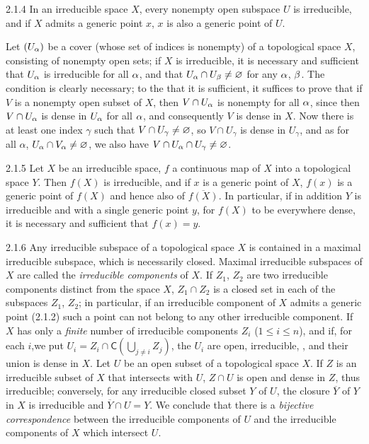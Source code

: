 \documentclass[../main.tex]{subfiles}
\begin{document}
\begin{cx}{2.1.4}
In an irreducible space $X$, every nonempty open subspace $U$ is irreducible, and if $X$
admits a generic point $x$, $x$ is also a generic point of $U$.

Let $(U_\alpha)$ be a cover (whose set of indices is nonempty) of a topological space $X$,
consisting of nonempty open sets; if $X$ is irreducible, it is necessary and sufficient that
$U_\alpha$ is irreducible for all $\alpha$, and that $U_\alpha\cap U_\beta\neq\varnothing$ for any
$\alpha$, $\beta$. The condition is clearly necessary; to the that it is sufficient, it suffices
to prove that if $V$ is a nonempty open subset of $X$, then $V\cap U_\alpha$ is nonempty for all
$\alpha$, since then $V\cap U_\alpha$ is dense in $U_\alpha$ for all $\alpha$, and consequently
$V$ is dense in $X$. Now there is at least one index $\gamma$ such that $V\cap U_\gamma\neq\varnothing$,
so $V\cap U_\gamma$ is dense in $U_\gamma$, and as for all $\alpha$, $U_\alpha\cap V_\alpha\neq\varnothing$,
we also have $V\cap U_\alpha\cap U_\gamma\neq\varnothing$.
\end{cx}

\begin{cx}{2.1.5}
Let $X$ be an irreducible space, $f$ a continuous map of $X$ into a topological space $Y$.
Then $f(X)$ is irreducible, and if $x$ is a generic point of $X$, $f(x)$ is a generic point of
$f(X)$ and hence also of $\overline{f(X)}$. In particular, if in addition $Y$ is irreducible and
with a single generic point $y$, for $f(X)$ to be everywhere dense, it is necessary and sufficient
that $f(x)=y$.
\end{cx}

\begin{cx}{2.1.6}
Any irreducible subspace of a topological space $X$ is contained
in a maximal irreducible subspace, which is necessarily closed.
Maximal irreducible subspaces of $X$ are called the \emph{irreducible components} of $X$.
If $Z_1$, $Z_2$ are two irreducible components distinct from the space $X$, $Z_1\cap Z_2$ is a closed
 set in each of the subspaces $Z_1$, $Z_2$; in particular, if an irreducible component
of $X$ admits a generic point (2.1.2) such a point can not belong to any other
irreducible component. If $X$ has only a \emph{finite} number of irreducible 
components $Z_i$ ($1\leq i\leq n$), and if, for each $i$,we put $U_i=Z_i\cap\mathsf{C}(\bigcup_{j\neq i} Z_j)$,
the $U_i$ are open, irreducible, , and their union is dense in $X$.
Let $U$ be an open subset of a topological space $X$. If $Z$ is an irreducible subset of $X$
that intersects with $U$, $Z\cap U$ is open and dense in $Z$, thus irreducible; conversely, for any irreducible
closed subset $Y$ of $U$, the closure $\overline{Y}$ of $Y$ in $X$ is irreducible and $\overline{Y}\cap U=Y$.
We conclude that there is a \emph{bijective correspondence} between the irreducible components of $U$ and the
irreducible components of $X$ which intersect $U$.
\end{cx}
\end{document}
